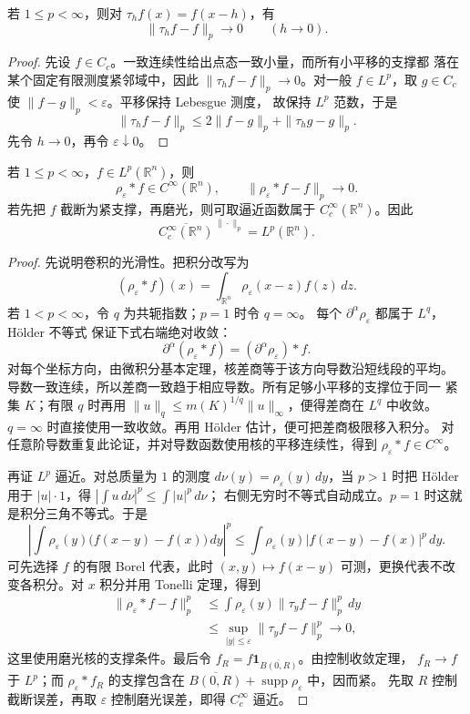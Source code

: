 \begin{proposition}[平移连续性]
\label{prop:translation-continuity-lp}
若 \(1\le p<\infty\)，则对
\(\tau_hf(x)=f(x-h)\)，有
\[
 \|\tau_hf-f\|_p\longrightarrow0\qquad(h\to0).
\]
\end{proposition}

\begin{proof}
先设 \(f\in C_c\)。一致连续性给出点态一致小量，而所有小平移的支撑都
落在某个固定有限测度紧邻域中，因此
\(\|\tau_hf-f\|_p\to0\)。对一般 \(f\in L^p\)，取
\(g\in C_c\) 使 \(\|f-g\|_p<\varepsilon\)。平移保持 Lebesgue 测度，
故保持 \(L^p\) 范数，于是
\[
 \|\tau_hf-f\|_p
 \le2\|f-g\|_p+\|\tau_hg-g\|_p.
\]
先令 \(h\to0\)，再令 \(\varepsilon\downarrow0\)。
\end{proof}

\begin{theorem}[磨光逼近]
\label{thm:mollifier-approximation}
若 \(1\le p<\infty\)，\(f\in L^p(\mathbb R^n)\)，则
\[
 \rho_\varepsilon*f\in C^\infty(\mathbb R^n),\qquad
 \|\rho_\varepsilon*f-f\|_p\longrightarrow0.
\]
若先把 \(f\) 截断为紧支撑，再磨光，则可取逼近函数属于
\(C_c^\infty(\mathbb R^n)\)。因此
\[
 \overline{C_c^\infty(\mathbb R^n)}^{\,\|\cdot\|_p}
 =L^p(\mathbb R^n).
\]
\end{theorem}

\begin{proof}
先说明卷积的光滑性。把积分改写为
\[
 (\rho_\varepsilon*f)(x)
 =\int_{\mathbb R^n}\rho_\varepsilon(x-z)f(z)\,dz.
\]
若 \(1<p<\infty\)，令 \(q\) 为共轭指数；\(p=1\) 时令 \(q=\infty\)。
每个 \(\partial^\alpha\rho_\varepsilon\) 都属于 \(L^q\)，Hölder 不等式
保证下式右端绝对收敛：
\[
 \partial^\alpha(\rho_\varepsilon*f)
 =(\partial^\alpha\rho_\varepsilon)*f.
\]
对每个坐标方向，由微积分基本定理，核差商等于该方向导数沿短线段的平均。
导数一致连续，所以差商一致趋于相应导数。所有足够小平移的支撑位于同一
紧集 \(K\)；有限 \(q\) 时再用
\(\|u\|_q\le m(K)^{1/q}\|u\|_\infty\)，便得差商在 \(L^q\) 中收敛。
\(q=\infty\) 时直接使用一致收敛。再用 Hölder 估计，便可把差商极限移入积分。
对任意阶导数重复此论证，并对导数函数使用核的平移连续性，得到
\(\rho_\varepsilon*f\in C^\infty\)。

再证 \(L^p\) 逼近。对总质量为 \(1\) 的测度
\(d\nu(y)=\rho_\varepsilon(y)\,dy\)，当 \(p>1\) 时把 Hölder 用于
\(|u|\cdot1\)，得 \(|\int u\,d\nu|^p\le\int|u|^p\,d\nu\)；
右侧无穷时不等式自动成立。\(p=1\) 时这就是积分三角不等式。于是
\[
 \left|\int\rho_\varepsilon(y)
   \bigl(f(x-y)-f(x)\bigr)\,dy\right|^p
 \le\int\rho_\varepsilon(y)|f(x-y)-f(x)|^p\,dy.
\]
可先选择 \(f\) 的有限 Borel 代表，此时 \((x,y)\mapsto f(x-y)\)
可测，更换代表不改变各积分。对 \(x\) 积分并用 Tonelli 定理，得到
\[
 \begin{split}
 \|\rho_\varepsilon*f-f\|_p^p
 &\le\int\rho_\varepsilon(y)\|\tau_yf-f\|_p^p\,dy\\
 &\le\sup_{|y|\le\varepsilon}\|\tau_yf-f\|_p^p
 \longrightarrow0,
 \end{split}
\]
这里使用磨光核的支撑条件。最后令
\(f_R=f\mathbf1_{\overline{B(0,R)}}\)。由控制收敛定理，
\(f_R\to f\) 于 \(L^p\)；而
\(\rho_\varepsilon*f_R\) 的支撑包含在
\(\overline{B(0,R)}+\operatorname{supp}\rho_\varepsilon\) 中，因而紧。
先取 \(R\) 控制截断误差，再取 \(\varepsilon\) 控制磨光误差，即得
\(C_c^\infty\) 逼近。
\end{proof}

